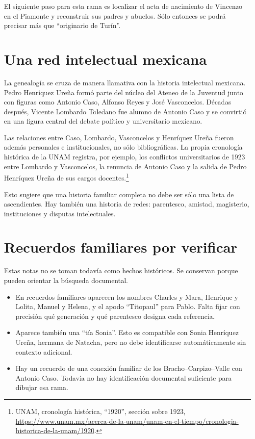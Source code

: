 El siguiente paso para esta rama es localizar el
acta de nacimiento de Vincenzo en el Piamonte y
reconstruir sus padres y abuelos. Sólo entonces se
podrá precisar más que ``originario de Turín''.

\section{Una red intelectual mexicana}
\label{section-genealogia-red-intelectual}

La genealogía se cruza de manera llamativa con la
historia intelectual mexicana. Pedro Henríquez Ureña
formó parte del núcleo del Ateneo de la Juventud
junto con figuras como Antonio Caso, Alfonso Reyes
y José Vasconcelos. Décadas después, Vicente
Lombardo Toledano fue alumno de Antonio Caso y se
convirtió en una figura central del debate político
y universitario mexicano.

Las relaciones entre Caso, Lombardo, Vasconcelos y
Henríquez Ureña fueron además personales e
institucionales, no sólo bibliográficas. La propia
cronología histórica de la UNAM registra, por
ejemplo, los conflictos universitarios de 1923
entre Lombardo y Vasconcelos, la renuncia de
Antonio Caso y la salida de Pedro Henríquez Ureña
de sus cargos docentes.\footnote{%
UNAM, cronología histórica, ``1920'', sección sobre
1923,
\url{https://www.unam.mx/acerca-de-la-unam/unam-en-el-tiempo/cronologia-historica-de-la-unam/1920}.}

Esto sugiere que una historia familiar completa no
debe ser sólo una lista de ascendientes. Hay también
una historia de redes: parentesco, amistad,
magisterio, instituciones y disputas intelectuales.

\section{Recuerdos familiares por verificar}
\label{section-genealogia-recuerdos-familiares}

Estas notas no se toman todavía como hechos
históricos. Se conservan porque pueden orientar la
búsqueda documental.

\begin{itemize}
\item En recuerdos familiares aparecen los nombres
Charles y Mara, Henrique y Lolita, Manuel y Helena,
y el apodo ``Titopaul'' para Pablo. Falta fijar con
precisión qué generación y qué parentesco designa
cada referencia.
\item Aparece también una ``tía Sonia''. Esto es
compatible con Sonia Henríquez Ureña, hermana de
Natacha, pero no debe identificarse automáticamente
sin contexto adicional.
\item Hay un recuerdo de una conexión familiar de
los Bracho--Carpizo--Valle con Antonio Caso. Todavía
no hay identificación documental suficiente para
dibujar esa rama.
\end{itemize}

